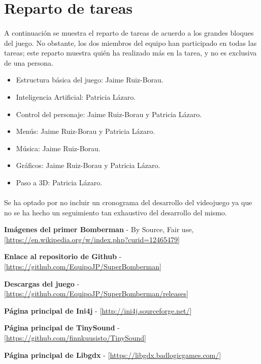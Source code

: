 \documentclass[a4paper]{article}
\begin{document}
\section{Reparto de tareas}

\paragraph{}A continuación se muestra el reparto de tareas de acuerdo a los grandes bloques del juego. No obstante, los dos miembros del equipo han participado en todas las tareas; este reparto muestra quién ha realizado más en la tarea, y no es exclusiva de una persona.

\begin{itemize}
\item Estructura básica del juego: Jaime Ruiz-Borau.
\item Inteligencia Artificial: Patricia Lázaro.
\item Control del personaje: Jaime Ruiz-Borau y Patricia Lázaro.
\item Menús: Jaime Ruiz-Borau y Patricia Lázaro.
\item Música: Jaime Ruiz-Borau.
\item Gráficos: Jaime Ruiz-Borau y Patricia Lázaro.
\item Paso a 3D: Patricia Lázaro.
\end{itemize}

\paragraph{}Se ha optado por no incluir un cronograma del desarrollo del videojuego ya que no se ha hecho un seguimiento tan exhaustivo del desarrollo del mismo.
\newpage

\begin{thebibliography}{99}
	 \textbf{Imágenes del primer Bomberman} - By Source, Fair use, [\url{https://en.wikipedia.org/w/index.php?curid=12465479}]
	
	\bibitem{} \textbf{Enlace al repositorio de Github} - [\url{https://github.com/EquipoJP/SuperBomberman}]
	
	\bibitem{} \textbf{Descargas del juego} - [\url{https://github.com/EquipoJP/SuperBomberman/releases}]
	
	\bibitem{} \textbf{Página principal de Ini4j} - [\url{http://ini4j.sourceforge.net/}]
	
	\bibitem{} \textbf{Página principal de TinySound} - [\url{https://github.com/finnkuusisto/TinySound}]
	
	\bibitem{} \textbf{Página principal de Libgdx} - [\url{https://libgdx.badlogicgames.com/}]
	
\end{thebibliography}
\end{document}
